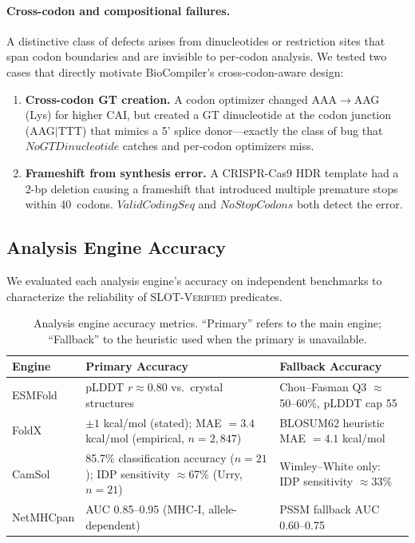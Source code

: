 \documentclass[acmsmall,review,anonymous]{acmart}
\begin{document}
\paragraph{Cross-codon and compositional failures.}
A distinctive class of defects arises from dinucleotides or restriction
sites that span codon boundaries and are invisible to per-codon
analysis.  We tested two cases that directly motivate BioCompiler's
cross-codon-aware design:

\begin{enumerate}[leftmargin=*,itemsep=1pt,topsep=2pt]
\item \textbf{Cross-codon GT creation.}  A codon optimizer changed
AAA$\to$AAG (Lys) for higher CAI, but created a GT dinucleotide at the
codon junction (AAG$\mid$TTT) that mimics a 5' splice donor---exactly
the class of bug that $\mathit{NoGTDinucleotide}$ catches and
per-codon optimizers miss.

\item \textbf{Frameshift from synthesis error.}  A CRISPR-Cas9 HDR
template had a 2-bp deletion causing a frameshift that introduced
multiple premature stops within 40~codons.
$\mathit{ValidCodingSeq}$ and $\mathit{NoStopCodons}$ both detect the
error.
\end{enumerate}

\subsection{Analysis Engine Accuracy}\label{sec:engineaccuracy}

We evaluated each analysis engine's accuracy on independent benchmarks to
characterize the reliability of SLOT-\textsc{Verified} predicates.

\begin{table}[t]
\centering
\caption{Analysis engine accuracy metrics.  ``Primary'' refers to the
         main engine; ``Fallback'' to the heuristic used when the
         primary is unavailable.}
\label{tab:engineaccuracy}
\begin{tabular}{llp{4.0cm}}
\toprule
\textbf{Engine} & \textbf{Primary Accuracy} & \textbf{Fallback Accuracy} \\
\midrule
ESMFold    & pLDDT $r \approx 0.80$ vs.\ crystal structures &
             Chou--Fasman Q3 $\approx$ 50--60\%, pLDDT cap 55 \\
FoldX      & $\pm 1$ kcal/mol (stated); MAE $= 3.4$ kcal/mol (empirical, $n = 2{,}847$) &
             BLOSUM62 heuristic MAE $= 4.1$ kcal/mol \\
CamSol     & 85.7\% classification accuracy ($n = 21$); IDP sensitivity $\approx$67\% (Urry, $n = 21$) &
             Wimley--White only: IDP sensitivity $\approx$33\% \\
NetMHCpan  & AUC 0.85--0.95 (MHC-I, allele-dependent) &
             PSSM fallback AUC 0.60--0.75 \\
\bottomrule
\end{tabular}
\end{table}
\end{document}
